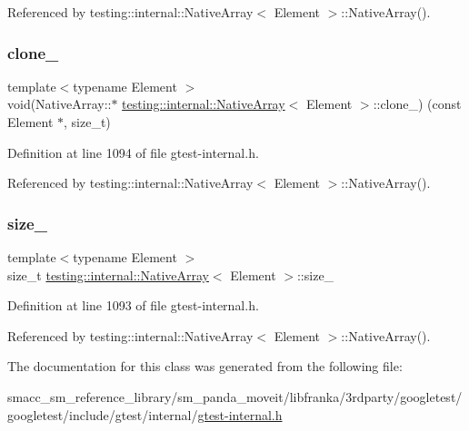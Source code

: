 Referenced by testing\+::internal\+::\+Native\+Array$<$ Element $>$\+::\+Native\+Array().

\mbox{\label{classtesting_1_1internal_1_1NativeArray_addd7442a10398a60215a9989bcbd8078}} 
\subsubsection{\texorpdfstring{clone\+\_\+}{clone\_}}
{\footnotesize\ttfamily template$<$typename Element $>$ \\
void(Native\+Array\+::$\ast$ \hyperlink{classtesting_1_1internal_1_1NativeArray}{testing\+::internal\+::\+Native\+Array}$<$ Element $>$\+::clone\+\_\+) (const Element $\ast$, size\+\_\+t)\hspace{0.3cm}{\ttfamily [private]}}



Definition at line 1094 of file gtest-\/internal.\+h.



Referenced by testing\+::internal\+::\+Native\+Array$<$ Element $>$\+::\+Native\+Array().

\mbox{\label{classtesting_1_1internal_1_1NativeArray_aa7e4251de39aaa75f697f0eaeedbf06e}} 
\subsubsection{\texorpdfstring{size\+\_\+}{size\_}}
{\footnotesize\ttfamily template$<$typename Element $>$ \\
size\+\_\+t \hyperlink{classtesting_1_1internal_1_1NativeArray}{testing\+::internal\+::\+Native\+Array}$<$ Element $>$\+::size\+\_\+\hspace{0.3cm}{\ttfamily [private]}}



Definition at line 1093 of file gtest-\/internal.\+h.



Referenced by testing\+::internal\+::\+Native\+Array$<$ Element $>$\+::\+Native\+Array().



The documentation for this class was generated from the following file\+:\begin{DoxyCompactItemize}
\item 
smacc\+\_\+sm\+\_\+reference\+\_\+library/sm\+\_\+panda\+\_\+moveit/libfranka/3rdparty/googletest/googletest/include/gtest/internal/\hyperlink{gtest-internal_8h}{gtest-\/internal.\+h}\end{DoxyCompactItemize}
